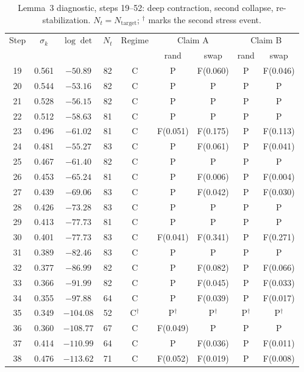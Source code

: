 \documentclass[12pt]{article}
\begin{document}
\begin{table}[ht]
\centering
\caption{Lemma~3 diagnostic, steps 19--52: deep contraction, second collapse, re-stabilization. $N_t = N_{\mathrm{target}}$; $^\dagger$ marks the second stress event.}
\label{tab:steps19-52}
\small
\begin{tabular}{ccccccccc}
\toprule
Step & $\sigma_k$ & $\log\det$ & $N_t$ & Regime & \multicolumn{2}{c}{Claim A} & \multicolumn{2}{c}{Claim B} \\
 & & & & & rand & swap & rand & swap \\
\midrule
19 & 0.561 & $-50.89$ & 82 & C & P & F(0.060) & P & F(0.046) \\
20 & 0.544 & $-53.16$ & 82 & C & P & P & P & P \\
21 & 0.528 & $-56.15$ & 82 & C & P & P & P & P \\
22 & 0.512 & $-58.63$ & 81 & C & P & P & P & P \\
23 & 0.496 & $-61.02$ & 81 & C & F(0.051) & F(0.175) & P & F(0.113) \\
24 & 0.481 & $-55.27$ & 83 & C & P & F(0.061) & P & F(0.041) \\
25 & 0.467 & $-61.40$ & 82 & C & P & P & P & P \\
26 & 0.453 & $-65.24$ & 81 & C & P & F(0.006) & P & F(0.004) \\
27 & 0.439 & $-69.06$ & 83 & C & P & F(0.042) & P & F(0.030) \\
28 & 0.426 & $-73.28$ & 83 & C & P & P & P & P \\
29 & 0.413 & $-77.73$ & 81 & C & P & P & P & P \\
30 & 0.401 & $-77.73$ & 83 & C & F(0.041) & F(0.341) & P & F(0.271) \\
31 & 0.389 & $-82.46$ & 83 & C & P & P & P & P \\
32 & 0.377 & $-86.99$ & 82 & C & P & F(0.082) & P & F(0.066) \\
33 & 0.366 & $-91.99$ & 82 & C & P & F(0.045) & P & F(0.033) \\
34 & 0.355 & $-97.88$ & 64 & C & P & F(0.039) & P & F(0.017) \\
35 & 0.349 & $-104.08$ & 52 & C$^\dagger$ & P$^\dagger$ & P$^\dagger$ & P$^\dagger$ & P$^\dagger$ \\
36 & 0.360 & $-108.77$ & 67 & C & F(0.049) & P & P & P \\
37 & 0.414 & $-110.99$ & 64 & C & P & F(0.036) & P & F(0.011) \\
38 & 0.476 & $-113.62$ & 71 & C & F(0.052) & F(0.019) & P & F(0.008) \\

\end{tabular}
\end{table}
\end{document}
